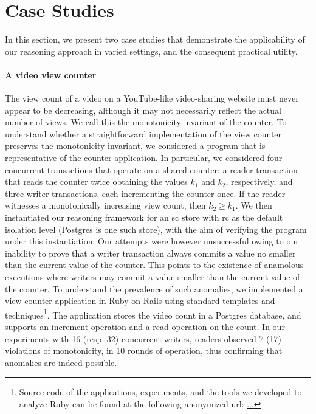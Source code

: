 \section{Case Studies}
\label{sec:case-studies}

In this section, we present two case studies that demonstrate the
applicability of our reasoning approach in varied settings, and the
consequent practical utility.

\paragraph{A video view counter} The view count of a video on a
YouTube-like video-sharing website must never appear to be decreasing,
although it may not necessarily reflect the actual number of views.
We call this the monotonicity invariant of the counter. To understand
whether a straightforward implementation of the view counter preserves
the monotonicity invariant, we considered a \txnimp program that is
representative of the counter application. In particular, we
considered four concurrent transactions that operate on a shared
counter: a reader transaction that reads the counter twice obtaining
the values $k_1$ and $k_2$, respectively, and three writer
transactions, each incrementing the counter once. If the reader
witnesses a monotonically increasing view count, then $k_2\ge k_1$. We
then instantiated our reasoning framework for an {\sc sc} store with
{\sc rc} as the default isolation level (Postgres is one such store),
with the aim of verifying the program under this instantiation.  Our
attempts were however unsuccessful owing to our inability to prove
that a writer transaction always commits a value no smaller than the
current value of the counter. This points to the existence of
anamolous executions where writers may commit a value smaller than the
current value of the counter. To understand the prevalence of such
anomalies, we implemented a view counter application in Ruby-on-Rails
using standard templates and techniques\footnote{Source code of the
applications, experiments, and the tools we developed to analyze Ruby
can be found at the following anonymized url: \url{...}}. The
application stores the video count in a Postgres database, and
supports an increment operation and a read operation on the count. In
our experiments with 16 (resp. 32) concurrent writers, readers
observed 7 (17) violations of monotonicity, in 10 rounds of operation,
thus confirming that anomalies are indeed possible. 

